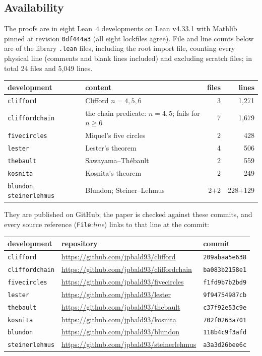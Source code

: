 \documentclass[11pt]{article}
\theoremstyle{definition}
\theoremstyle{remark}
\newcommand{\lean}[1]{\texttt{#1}}
\begin{document}
\subsection{Availability}\label{sec:avail}
The proofs are in eight Lean~4 developments on Lean v4.33.1 with Mathlib pinned at revision
\texttt{0df444a3} (all eight lockfiles agree). File and line counts below are of the library
\lean{.lean} files, including the root import file, counting every physical line (comments and blank
lines included) and excluding scratch files; in total 24 files and 5{,}049 lines.
\begin{center}\small
\begin{tabular}{llrr}
\toprule
development & content & files & lines\\
\midrule
\lean{clifford} & Clifford $n=4,5,6$ & 3 & 1{,}271\\
\lean{cliffordchain} & the chain predicate: $n=4,5$; fails for $n\ge6$ & 7 & 1{,}679\\
\lean{fivecircles} & Miquel's five circles & 2 & 428\\
\lean{lester} & Lester's theorem & 4 & 506\\
\lean{thebault} & Sawayama--Th\'ebault & 2 & 559\\
\lean{kosnita} & Kosnita's theorem & 2 & 249\\
\lean{blundon}, \lean{steinerlehmus} & Blundon; Steiner--Lehmus & 2+2 & 228+129\\
\bottomrule
\end{tabular}
\end{center}
They are published on GitHub; the paper is checked against these commits, and every source reference
(\texttt{File}:\textit{line}) links to that line at the commit:
\begin{center}\small
\begin{tabular}{lll}
\toprule
development & repository & commit\\
\midrule
\lean{clifford} & \url{https://github.com/jpbald93/clifford} & \texttt{209abaa5e638}\\
\lean{cliffordchain} & \url{https://github.com/jpbald93/cliffordchain} & \texttt{ba083b2158e1}\\
\lean{fivecircles} & \url{https://github.com/jpbald93/fivecircles} & \texttt{f1fd9b7b2bd9}\\
\lean{lester} & \url{https://github.com/jpbald93/lester} & \texttt{9f94754987cb}\\
\lean{thebault} & \url{https://github.com/jpbald93/thebault} & \texttt{c37f92e53c9e}\\
\lean{kosnita} & \url{https://github.com/jpbald93/kosnita} & \texttt{702f0263a701}\\
\lean{blundon} & \url{https://github.com/jpbald93/blundon} & \texttt{118b4c9f3afd}\\
\lean{steinerlehmus} & \url{https://github.com/jpbald93/steinerlehmus} & \texttt{a3a3d26bee6c}\\
\bottomrule
\end{tabular}
\end{center}
\end{document}
